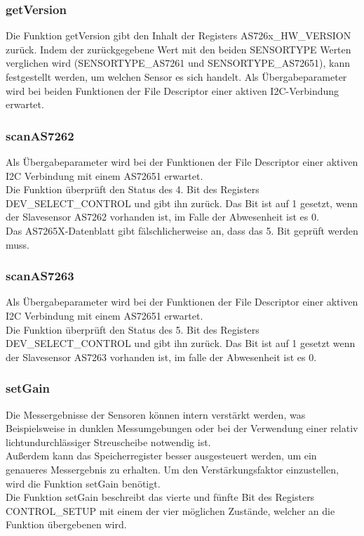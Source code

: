 

\subsubsection{getVersion}
Die Funktion getVersion gibt den Inhalt der Registers AS726x\_HW\_VERSION zurück. Indem der zurückgegebene Wert mit den beiden SENSORTYPE Werten verglichen wird (SENSORTYPE\_AS7261 und SENSORTYPE\_AS72651), kann festgestellt werden, um welchen Sensor es sich handelt. 
Als Übergabeparameter wird bei beiden Funktionen der File Descriptor einer aktiven I2C-Verbindung erwartet.

\subsubsection{scanAS7262}
Als Übergabeparameter wird bei der Funktionen der File Descriptor einer aktiven I2C Verbindung mit einem AS72651 erwartet.\\
Die Funktion überprüft den Status des 4. Bit des Registers DEV\_SELECT\_CONTROL und gibt ihn zurück. Das Bit ist auf 1 gesetzt, wenn der Slavesensor AS7262 vorhanden ist, im Falle der Abwesenheit ist es 0.\\
Das AS7265X-Datenblatt gibt fälschlicherweise an, dass das 5. Bit geprüft werden muss.\\

\subsubsection{scanAS7263}
Als Übergabeparameter wird bei der Funktionen der File Descriptor einer aktiven I2C Verbindung mit einem AS72651 erwartet.\\
Die Funktion überprüft den Status des 5. Bit des Registers DEV\_SELECT\_CONTROL und gibt ihn zurück. Das Bit ist auf 1 gesetzt wenn der Slavesensor AS7263 vorhanden ist, im falle der Abwesenheit ist es 0.\\

\subsubsection{setGain}
Die Messergebnisse der Sensoren können intern verstärkt werden, was Beispielsweise in dunklen Messumgebungen oder bei der Verwendung einer relativ lichtundurchlässiger Streuscheibe notwendig ist.\\
Außerdem kann das Speicherregister besser ausgesteuert werden, um ein genaueres Messergebnis zu erhalten.
Um den Verstärkungsfaktor einzustellen, wird die Funktion setGain benötigt.\\
Die Funktion setGain beschreibt das vierte und fünfte Bit des Registers CONTROL\_SETUP mit einem der vier möglichen Zustände, welcher an die Funktion übergebenen wird.

